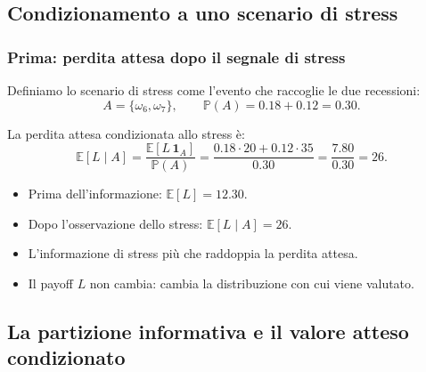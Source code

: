 \documentclass[handout]{beamer}%
\newenvironment{stepitemize}{\begin{itemize}[<+->]}{\end{itemize} }
\providecommand{\E}{\mathbb{E}}
\providecommand{\Prob}{\mathbb{P}}
\providecommand{\1}{\mathbf{1}}
\providecommand{\QTR}[2]{\csname #1\endcsname{#2}}
\begin{document}
\subsection{Condizionamento a uno scenario di stress}%

\begin{frame}%
%

\frametitle{Prima: perdita attesa dopo il segnale di stress}%
%

%


Definiamo lo scenario di stress come l'evento che raccoglie le due
recessioni:
\[
A = \{\omega_{6}, \omega_{7}\}, \qquad\Prob(A) = 0.18 + 0.12 = 0.30.
\]


\medskip

La perdita attesa condizionata allo stress \`{e}:
\[
\E[L \mid A] = \frac{\E[L\,\1_A]}{\Prob(A)} = \frac{0.18\cdot20 + 0.12\cdot
35}{0.30} = \frac{7.80}{0.30} = 26.
\]


\medskip

\begin{stepitemize}
\item Prima dell'informazione: $\E[L] = 12.30$.

\item Dopo l'osservazione dello stress: $\E[L \mid A] = 26$.

\item L'informazione di stress pi\`{u} che raddoppia la perdita attesa.

\item Il payoff $L$ non cambia: cambia la distribuzione con cui viene valutato.
\end{stepitemize}%

\transboxout
\end{frame}%


\subsection{La partizione informativa e il valore atteso condizionato}%
\end{document}
